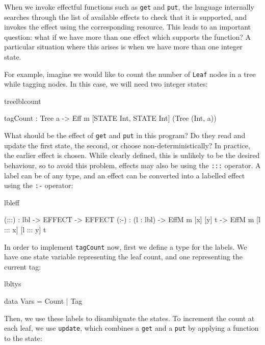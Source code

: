When we invoke effectful functions such as \texttt{get} and \texttt{put},
the \Eff{} language internally searches through the list of available effects
to check that it is supported, and invokes the effect using the corresponding
resource. This leads to an important question: what if we have more than one 
effect which supports the function? A particular situation where this arises
is when we have more than one integer state.

For example, imagine we would like to count the number of \texttt{Leaf} nodes
in a tree while tagging nodes.  In this case, we will need two integer states:

\begin{SaveVerbatim}{treelblcount}

tagCount : Tree a -> 
     Eff m [STATE Int, STATE Int] (Tree (Int, a))

\end{SaveVerbatim}

\noindent
What should be the effect of \texttt{get} and \texttt{put} in this program?
Do they read and update the first state, the second, or choose
non-deterministically? 
%
In practice, the earlier effect is chosen. While clearly defined, this is
unlikely to be the desired behaviour, so 
to avoid this problem, effects may also be  using the
\texttt{:::} operator.  A label can be of any type, and an
effect can be converted into a labelled effect using the \texttt{:-}
operator:

\begin{SaveVerbatim}{lbleff}

(:::) : lbl -> EFFECT -> EFFECT
(:-)  : (l : lbl) -> EffM m [x] [y] t -> 
                     EffM m [l ::: x] [l ::: y] t

\end{SaveVerbatim}

\noindent
In order to implement \texttt{tagCount} now, first we define a type for the
labels. We have one state variable representing the leaf count, and one
representing the current tag:

\begin{SaveVerbatim}{lbltys}

data Vars = Count | Tag

\end{SaveVerbatim}

\noindent
Then, we use these labels to disambiguate the states. To increment the count
at each leaf, we use \texttt{update}, which combines a \texttt{get} and a
\texttt{put} by applying a function to the state:

